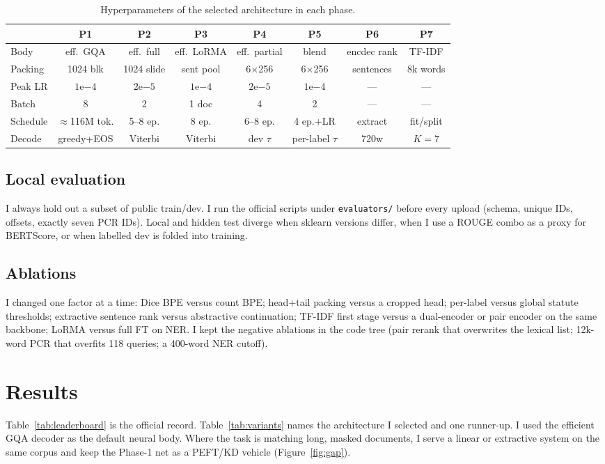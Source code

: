 \documentclass[11pt, oneside]{article}
\begin{document}
\begin{table}[H]
\centering
\scriptsize
\caption{Hyperparameters of the selected architecture in each phase.}
\label{tab:hparams}
\begin{tabular}{lccccccc}
\toprule
 & P1 & P2 & P3 & P4 & P5 & P6 & P7 \\
\midrule
Body & eff.\ GQA & eff.\ full & eff.\ LoRMA & eff.\ partial & blend & encdec rank & TF-IDF \\
Packing & 1024 blk & 1024 slide & sent pool & 6$\times$256 & 6$\times$256 & sentences & 8k words \\
Peak LR & $1\mathrm{e}{-4}$ & $2\mathrm{e}{-5}$ & $1\mathrm{e}{-4}$ & $2\mathrm{e}{-5}$ & $1\mathrm{e}{-4}$ & --- & --- \\
Batch & 8 & 2 & 1 doc & 4 & 2 & --- & --- \\
Schedule & $\approx$116M tok. & 5--8 ep. & 8 ep. & 6--8 ep. & 4 ep.+LR & extract & fit/split \\
Decode & greedy+EOS & Viterbi & Viterbi & dev $\tau$ & per-label $\tau$ & 720w & $K{=}7$ \\
\bottomrule
\end{tabular}
\end{table}

\subsection{Local evaluation}
I always hold out a subset of public train/dev. I run the official scripts under \texttt{evaluators/} before every upload (schema, unique IDs, offsets, exactly seven PCR IDs). Local and hidden test diverge when sklearn versions differ, when I use a ROUGE combo as a proxy for BERTScore, or when labelled dev is folded into training.

\subsection{Ablations}
I changed one factor at a time: Dice BPE versus count BPE; head+tail packing versus a cropped head; per-label versus global statute thresholds; extractive sentence rank versus abstractive continuation; TF-IDF first stage versus a dual-encoder or pair encoder on the same backbone; LoRMA versus full FT on NER. I kept the negative ablations in the code tree (pair rerank that overwrites the lexical list; 12k-word PCR that overfits 118 queries; a 400-word NER cutoff).

\section{Results}
Table~\ref{tab:leaderboard} is the official record. Table~\ref{tab:variants} names the architecture I selected and one runner-up. I used the efficient GQA decoder as the default neural body. Where the task is matching long, masked documents, I serve a linear or extractive system on the same corpus and keep the Phase-1 net as a PEFT/KD vehicle (Figure~\ref{fig:gap}).
\end{document}
